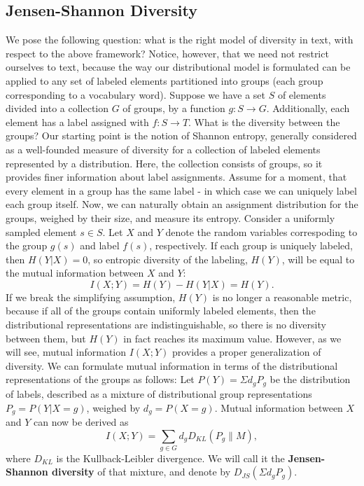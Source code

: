 \subsection{Jensen-Shannon Diversity}
\label{sec:jensen-shannon-divergence}
We pose the following question: what is the right model of diversity
in text, with respect to the above framework? Notice, however, that we
need not restrict ourselves to text, because the way our
distributional model is formulated can be applied to any set of
labeled elements partitioned into groups (each group corresponding to
a vocabulary word). Suppose we have a set $S$ of elements divided into
a collection $G$ of groups, by a function $g:S\rightarrow
G$. Additionally, each element has a label assigned with
$f:S\rightarrow T$. What is the diversity between the groups? Our
starting point is the notion of Shannon 
entropy, generally considered as a well-founded measure of diversity 
for a collection of labeled elements represented by a
distribution. Here, the collection consists of groups, so it provides
finer information about label assignments. Assume for a moment, that
every element in a group has the same label - in which case we can
uniquely label each group itself. Now, we can naturally obtain an
assignment distribution for the groups, weighed by their size, and
measure its entropy. Consider a uniformly sampled element $s\in
S$. Let $X$ and $Y$ denote the random variables correspoding to the
group $g(s)$ and label $f(s)$, respectively. If each group is uniquely
labeled, then $H(Y|X)=0$, so entropic diversity of the
labeling, $H(Y)$, will be equal to the mutual information between $X$
and $Y$: 
\[I(X;Y) = H(Y) - H(Y|X) =H(Y).\]
If we break the simplifying assumption, $H(Y)$ is no longer a
reasonable metric, because if all of the groups contain uniformly
labeled elements, then the distributional representations are
indistinguishable, so there is no diversity between them, but $H(Y)$
in fact reaches its maximum value. However, as we will see, mutual
information $I(X;Y)$ provides a proper generalization of diversity. We
can formulate mutual information in terms of the distributional
representations of the groups as follows:
\bed\label{jsd-definition}
Let $P(Y)=\Sigma d_g P_g$ be the distribution of labels,
described as a mixture of distributional group representations
$P_g=P(Y|X=g)$, weighed by $d_g=P(X=g)$. Mutual information between
$X$ and $Y$ can now be derived as
\[ I(X;Y)= \sum_{g\in G} d_g D_{KL}(P_g\|M),\]
where $D_{KL}$ is the Kullback-Leibler divergence.
We will call it the {\bf Jensen-Shannon diversity} of that
mixture, and denote by $D_{JS}(\Sigma d_gP_g)$.
\eed

